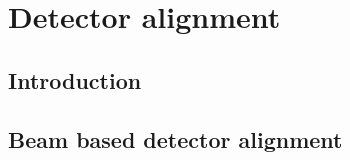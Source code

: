 \graphicspath{{09-Detector-alignment/Figures/}}

\section{Detector alignment}
\label{Sect:DA}

\subsection{Introduction}
\label{SubSect:DA_Intro}

\subsection{Beam based detector alignment}
\label{SubSect:DA_Detector_Alignment}
